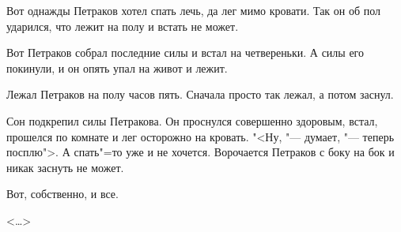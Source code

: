 \documentclass{article}
\begin{document}
    Вот  однажды  Петраков хотел спать лечь,
да лег мимо кровати. Так он об пол ударился,
что лежит на полу и встать не может.

    Вот  Петраков собрал  последние  силы  и
встал на четвереньки. А силы его покинули, и
он опять упал на живот и лежит.

    Лежал Петраков на полу часов пять.  
    Сначала просто так лежал, а потом заснул.

    Сон  подкрепил  силы  Петракова. 
    Он проснулся совершенно здоровым, встал,  прошелся
по комнате и  лег осторожно на кровать. "<Ну,
"--- думает, "--- теперь посплю">.  А спать"=то  уже
и не хочется.  Ворочается Петраков с боку на
бок и никак заснуть не может.

    Вот, собственно, и все.
\begin{flushright}
<\dots>
\end{flushright}		  
\end{document}
